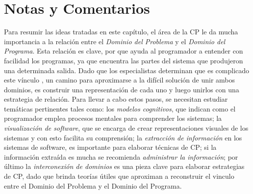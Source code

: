 


\pagebreak
\section{Notas y Comentarios}

Para resumir las ideas tratadas en este capítulo, el área de la CP le da mucha importancia a la relación entre el \textit{Dominio del Problema} y el \textit{Dominio del Programa}. Esta relación es clave, por que ayuda al programador a entender con facilidad los programas, ya que encuentra las partes del sistema que produjeron una determinada salida. Dado que los especialistas determinan que es complicado este vínculo \cite{AMPM11,MPMR07,MBPHRU10,DWE04}, un camino para aproximarse a la difícil solución de unir ambos dominios, es construir una representación de cada uno y luego unirlos con una estrategia de relación. Para llevar a cabo estos pasos, se necesitan estudiar temáticas pertinentes tales como: los \textit{modelos cognitivos}, que indican como el programador emplea procesos mentales para comprender los sistemas; la \textit{visualización de software}, que se encarga de crear representaciones visuales de los sistemas y con esto facilita su comprensión; la \textit{extracción de información} en los sistemas de software, es importante para elaborar técnicas de CP; si la información extraída es mucha se recomienda \textit{administrar la información}; por último la \textit{interconexión de dominios} es una pieza clave para elaborar estrategias de CP, dado que brinda teorías útiles que aproximan a reconstruir el vinculo entre el Dominio del Problema y el Dominio del Programa.

